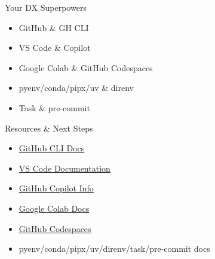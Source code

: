 \documentclass[aspectratio=169]{beamer}
\begin{document}
%
\begin{frame}{Your DX Superpowers}
\begin{itemize}
  \item GitHub \& GH CLI
  \item VS Code \& Copilot
  \item Google Colab \& GitHub Codespaces
  \item pyenv/conda/pipx/uv \& direnv
  \item Task \& pre-commit
\end{itemize}
\vspace{-1em}
\end{frame}

\begin{frame}{Resources \& Next Steps}
\begin{itemize}
\item \href{https://cli.github.com/}{GitHub CLI Docs}
\item \href{https://code.visualstudio.com/docs}{VS Code Documentation}
\item \href{https://github.com/features/copilot}{GitHub Copilot Info}
\item \href{https://research.google.com/colaboratory/}{Google Colab Docs}
\item \href{https://github.com/features/codespaces}{GitHub Codespaces}
\item pyenv/conda/pipx/uv/direnv/task/pre-commit docs
\end{itemize}\label{lastpage}
\end{frame}
\end{document}
